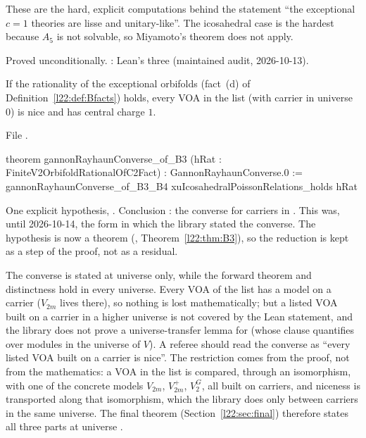 \begin{physics}
These are the hard, explicit computations behind the statement ``the exceptional $c=1$ theories are lisse and
unitary-like''. The icosahedral case is the hardest because $A_5$ is not solvable, so Miyamoto's theorem does not
apply.
\end{physics}

\begin{status}
Proved unconditionally. : Lean's three (maintained audit, 2026-10-13).
\end{status}

\begin{theorem}\label{l22:thm:converseB3}
If the rationality of the exceptional orbifolds \textup{(}fact~(d) of Definition~\ref{l22:def:Bfacts}\textup{)} holds, every VOA in the list (with carrier in universe $0$) is nice and has central charge $1$.
\end{theorem}
\noindent File .
\begin{leancode}
theorem gannonRayhaunConverse_of_B3 (hRat : FiniteV2OrbifoldRationalOfC2Fact) :
    GannonRayhaunConverse.{0} :=
  gannonRayhaunConverse_of_B3_B4 xuIcosahedralPoissonRelations_holds hRat
\end{leancode}

\begin{dictionary}
One explicit hypothesis, . Conclusion
: the converse for carriers in . This was, until 2026-10-14, the form in
which the library stated the converse. The hypothesis is now a theorem (,
Theorem~\ref{l22:thm:B3}), so the reduction is kept as a step of the proof, not as a residual.
\end{dictionary}

\begin{remark}[Universe]\label{l22:rem:universe}
The converse is stated at universe  only, while the forward theorem and distinctness hold in every universe.
Every VOA of the list has a model on a  carrier ($V_{2m}$ lives there), so nothing is lost
mathematically; but a listed VOA built on a carrier in a higher universe is not covered by the Lean statement, and
the library does not prove a universe-transfer lemma for  (whose  clause quantifies
over modules in the universe of $V$). A referee should read the converse as ``every listed VOA built on a
 carrier is nice''. The restriction comes from the proof, not from the mathematics: a VOA in the list is compared, through an
isomorphism, with one of the concrete models $V_{2m}$, $V_{2m}^+$, $V_2^G$, all built on  carriers, and
niceness is transported along that isomorphism, which the library does only between carriers in the same universe.
The final theorem (Section~\ref{l22:sec:final}) therefore states all three parts at universe .
\end{remark}

